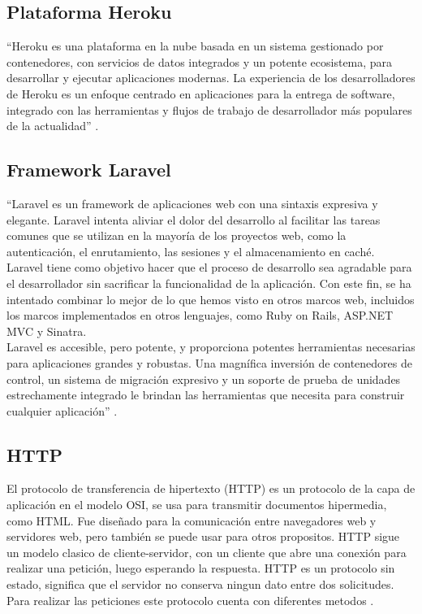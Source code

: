 \subsection{Plataforma Heroku}

``Heroku es una plataforma en la nube basada en un sistema gestionado por contenedores, con servicios de datos integrados y un potente ecosistema, para desarrollar y ejecutar aplicaciones modernas. La experiencia de los desarrolladores de Heroku es un enfoque centrado en aplicaciones para la entrega de software, integrado con las herramientas y flujos de trabajo de desarrollador más populares de la actualidad'' \cite{Hero}.


\subsection{Framework Laravel}

``Laravel es un framework de aplicaciones web con una sintaxis expresiva y elegante. Laravel intenta aliviar el dolor del desarrollo al facilitar las tareas comunes que se utilizan en la mayoría de los proyectos web, como la autenticación, el enrutamiento, las sesiones y el almacenamiento en caché.\\

Laravel tiene como objetivo hacer que el proceso de desarrollo sea agradable para el desarrollador sin sacrificar la funcionalidad de la aplicación. Con este fin, se ha intentado combinar lo mejor de lo que hemos visto en otros marcos web, incluidos los marcos implementados en otros lenguajes, como Ruby on Rails, ASP.NET MVC y Sinatra.\\

Laravel es accesible, pero potente, y proporciona potentes herramientas necesarias para aplicaciones grandes y robustas. Una magnífica inversión de contenedores de control, un sistema de migración expresivo y un soporte de prueba de unidades estrechamente integrado le brindan las herramientas que necesita para construir cualquier aplicación'' \cite{Lara}.

\subsection{HTTP}

El protocolo de transferencia de hipertexto (HTTP) es un protocolo de la capa de aplicación en el modelo OSI, se usa para transmitir documentos hipermedia, como HTML. Fue diseñado para la comunicación entre navegadores web y servidores web, pero también se puede usar para otros propositos. HTTP sigue un modelo clasico de cliente-servidor, con un cliente que abre una conexión para realizar una petición, luego esperando la respuesta. HTTP es un protocolo sin estado, significa que el servidor no conserva ningun dato entre dos solicitudes. Para realizar las peticiones este protocolo cuenta con diferentes metodos \cite{HTTP}.

